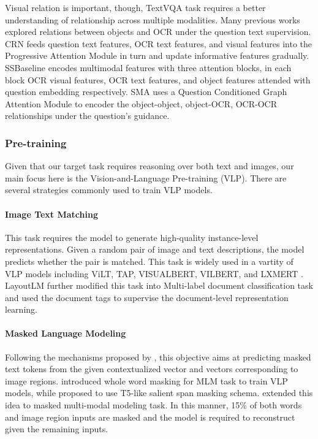 \documentclass[11pt,a4paper]{article}
\begin{document}
Visual relation is important, though, TextVQA task requires a better understanding of relationship across multiple modalities. Many previous works explored relations between objects and OCR under the question text supervision. CRN\cite{liu2020cascade} feeds question text features, OCR text features, and visual features into the Progressive Attention Module in turn and update informative features gradually. SSBaseline\cite{zhu2020simple} encodes multimodal features with three attention blocks, in each block OCR visual features, OCR text features, and object features attended with question embedding respectively. SMA\cite{gao2021sma} uses a Question Conditioned Graph Attention Module to encoder the object-object, object-OCR, OCR-OCR relationships under the question's guidance. 

\subsubsection{Pre-training}
Given that our target task requires reasoning over both text and images, our main focus here is the Vision-and-Language Pre-training (VLP). There are several strategies commonly used to train VLP models.

\paragraph{Image Text Matching} This task requires the model to generate high-quality instance-level representations. Given a random pair of image and text descriptions, the model predicts whether the pair is matched. This task is widely used in a vartity of VLP models including ViLT, TAP, VISUALBERT, VILBERT, and LXMERT \cite{kim2021vilt, yang2021tap, li2019visualbert, lu2019vilbert, tan2019lxmert}. LayoutLM \cite{xu2020layoutlm} further modified this task into Multi-label document classification task and used the document tags to supervise the document-level representation learning. 

\paragraph{Masked Language Modeling} Following the mechanisms proposed by \citet{kenton2019bert}, this objective aims at predicting masked text tokens from the given contextualized vector and vectors corresponding to image regions. \citet{kim2021vilt} introduced whole word masking for MLM task to train VLP models, while \citet{powalski2021going} proposed to use T5-like salient span masking schema. \citet{lu2019vilbert, tan2019lxmert} extended this idea to masked multi-modal modeling task. In this manner, 15\% of both words and image region inputs are masked and the model is required to reconstruct given the remaining inputs. 
\end{document}
